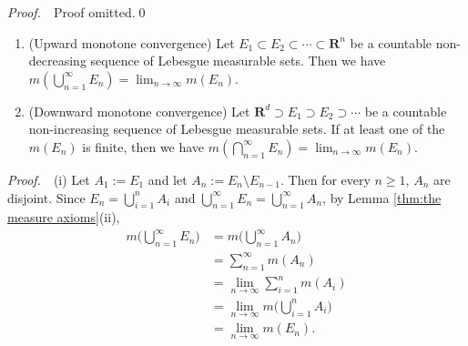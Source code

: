 \documentclass{book}
\theoremstyle{defstyle}
\theoremstyle{thmstyle}
\newcommand{\pff}{\noindent\emph{Proof.}~~}
\begin{document}
\pff Proof omitted.\qed

\begin{theorem}\label{thm:monotone convergence theorem for measurable sets}
    \quad
    \begin{enumerate}
        \item (Upward monotone convergence) Let $E_1 \subset E_2 \subset \cdots \subset \mathbf{R}^n$ be a countable non-decreasing sequence of Lebesgue measurable sets. Then we have $m(\bigcup_{n = 1}^{\infty}E_n) = \lim_{n \to \infty}m(E_n)$.
        \item (Downward monotone convergence) Let $\mathbf{R}^d \supset E_1 \supset E_2 \supset \cdots$ be a countable non-increasing sequence of Lebesgue measurable sets. If at least one of the $m(E_n)$ is finite, then we have $m(\bigcap_{n = 1}^{\infty}E_n) = \lim_{n \to \infty}m(E_n)$.
    \end{enumerate}
\end{theorem}

\pff (i) Let $A_1 := E_1$ and let $A_n := E_n \setminus E_{n - 1}$. Then for every $n \geq 1$, $A_n$ are disjoint. Since $E_n = \bigcup_{i = 1}^{n}A_i$ and $\bigcup_{n = 1}^{\infty}E_n = \bigcup_{n = 1}^{\infty}A_n$, by Lemma \ref{thm:the measure axioms}(ii),
    \begin{align*}
        m\Big(\bigcup_{n = 1}^{\infty}E_n\Big)
        &= m\Big(\bigcup_{n = 1}^{\infty}A_n\Big)\\
        &= \sum_{n = 1}^{\infty}m(A_n)\\
        &= \lim_{n \to \infty}\sum_{i = 1}^{n}m(A_i)\\
        &= \lim_{n \to \infty}m\Big(\bigcup_{i = 1}^{n}A_i\Big)\\
        &= \lim_{n \to \infty}m(E_n).
    \end{align*}
\end{document}
